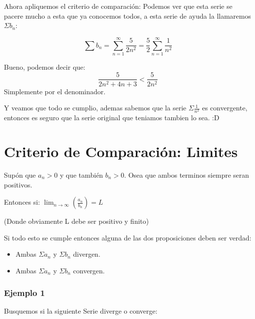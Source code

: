 \documentclass[12pt]{report}                                %
\begin{document}
            Ahora apliquemos el criterio de comparación: Podemos ver que esta serie se pacere mucho a esta
            que ya conocemos todos, a esta serie de ayuda la llamaremos $\Sigma b_n$:

            \begin{equation*}
                \sum b_n = \sum_{n=1}^{\infty} \frac{5}{2n^2} = \frac{5}{2}\sum_{n=1}^{\infty} \frac{1}{n^2}
            \end{equation*}

            Bueno, podemos decir que:
            \begin{equation*}
                \frac{5}{2n^2 +4n +3} < \frac{5}{2n^2}
            \end{equation*}
            Simplemente por el denominador.

            Y veamos que todo se cumplio, ademas sabemos que la serie $\Sigma \frac{1}{n^2}$ es convergente,
            entonces es seguro que la serie original que teniamos tambien lo sea. :D



    \clearpage
    \section{Criterio de Comparación: Limites}

        Supón que $a _n > 0$ y que también $b_n > 0$. Osea que ambos terminos siempre seran positivos.

        Entonces si:
        $\lim_{n \to \infty} \left( \frac{a_n}{b_n} \right) = L$

        (Donde obviamente L debe ser positivo y finito)

        Si todo esto se cumple entonces alguna de las dos proposiciones deben ser verdad:
        \begin{itemize}
            \item Ambas $\Sigma a_n$ y $\Sigma b_n$ divergen.
            \item Ambas $\Sigma a_n$ y $\Sigma b_n$ convergen.
        \end{itemize}

        \subsubsection{Ejemplo 1}
            Busquemos si la siguiente Serie diverge o converge:
\end{document}

